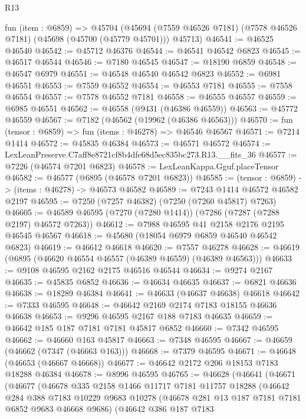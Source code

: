 \begin{lexlean}{R13}
\begin{coremodule}
  fun (item : @6859) =>
  @45704 (@45694 (@7559 @46526 @7181) (@7578 @46526 @7181) (@45698 (@45700 (@45779 @45701))) @45713)
@46541 := @46525 @46540
@46542 := @45712 @46376
@46544 := @46541 @46542 @6823
@46545 := @46517 @46544
@46546 := @7180 @46545
@46547 := @18190 @6859
@46548 := @46547 @6979
@46551 := @46548 @46540 @46542 @6823
@46552 := @6981 @46551
@46553 := @7559 @46552
@46554 := @46553 @7181
@46555 := @7558 @46554
@46557 := @7578 @46552 @7181
@46558 := @46555 @46557
@46559 := @6985 @46551
@46562 := @46558 (@9431 (@46386 @46559))
@46563 := @45772 @46559
@46567 := @7182 (@46562 (@19962 (@46386 @46563)))
@46570 := fun (tensor : @6859) => fun (items : @46278) => @46546 @46567
@46571 := @7214 @1414
@46572 := @45835 @46384
@46573 := @46571 @46572
@46574 := LexLeanPreserve.C7aff8e8721cf8b4dfe68d5ec835bc273.R13.__fits_36
@46577 := @7226 (@46574 @7201 @6823)
@46578 := LexLeanKappa.Gguf.placeTensor
@46582 := @46577 (@6895 (@46578 @7201 @6823))
@46585 := (tensor : @6859) -> (items : @46278) -> @46573 @46582
@46589 := @7243 @1414 @46572 @46582 @2197
@46595 := @7250 (@7257 @46382) (@7250 (@7260 @45817) @7263)
@46605 := @46589 @46595 (@7270 (@7280 @1414)) (@7286 (@7287 (@7288 @2197) @46572 @7263))
@46612 := @7988 @46595 @41 @2158 @2176 @2195 @46545 @46567
@46618 := @45680 (@18054 @6979 @6859 @46540 @46542 @6823)
@46619 := @46612 @46618
@46620 := @7557 @46278
@46628 := @46619 (@6895 (@46620 @46554 @46557 (@46389 @46559) (@46389 @46563)))
@46633 := @9108 @46595 @2162 @2175 @46516 @46544
@46634 := @9274 @2167
@46635 := @45835 @6852
@46636 := @46634 @46635
@46637 := @6821 @46636
@46638 := @18289 @46384
@46641 := @46633 (@46637 @46638) @46618
@46642 := @7333 @46595
@46648 := @46642 @2169 @2174 @7183 @18155 @46636 @46638
@46653 := @9296 @46595 @2167 @188 @7183 @46635
@46659 := @46642 @185 @187 @7181 @7181 @45817 @6852
@46660 := @7342 @46595
@46662 := @46660 @163 @45817
@46663 := @7348 @46595
@46667 := @46659 (@46662 (@7347 (@46663 @163)))
@46668 := @7379 @46595
@46671 := @46648 (@46653 (@46667 @46668))
@46677 := @46642 @2172 @206 @18153 @7183 @18288 @46384
@46678 := @8996 @46595
@46765 := @46628
    (@46641
      (@46671
        (@46677
          (@46678
            @335
            @2158
            @1466
            @11717
            @7181
            @11757
            @18288
            (@46642
              @284
              @388
              @7183
              @10229
              @9683
              @10278
              (@46678 @281 @13 @187 @7181 @7181 @6852 @9683 @46668 @9686)
              (@46642
                @386
                @187
                @7183

\end{coremodule}
\end{lexlean}
